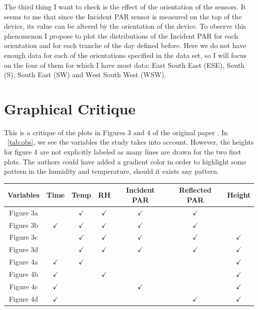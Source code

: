 \documentclass[11pt]{article}\usepackage[]{graphicx}\usepackage[]{color}
\begin{document}
The third thing I want to check is the effect of the orientation of the sensors. It seems to me that since the Incident PAR sensor is measured on the top of the device, its value can be altered by the orientation of the device. To observe this phenomenon I propose to plot the distributions of the Incident PAR for each orientation and for each tranche of the day defined before. Here we do not have enough data for each of the orientations specified in the data set, so I will focus on the four of them for which I have most data: East South East (ESE), South (S), South East (SW) and West South West (WSW).


\section{Graphical Critique}
This is a critique of the plots in Figures 3 and 4 of the original paper \cite{tolle2005macroscope}. In  ~\ref{tab:obs}, we see the variables the study takes into account. However, the heights for figure 4 are not explicitly labeled as many lines are drawn for the two first plots. The authors could have added a gradient color in order to highlight some pattern in the humidity and temperature, should it exists any pattern. 
\begin{center}
   \begin{tabular}{| c | c | c | c | c | c | c |}
     \hline
     Variables & Time         & Temp         & RH          & Incident PAR & Reflected PAR& Height\\ \hline
     Figure 3a &              & $\checkmark$ &$\checkmark$ & $\checkmark$ & $\checkmark$ &             \\ \hline
     Figure 3b & $\checkmark$ & $\checkmark$ &$\checkmark$ & $\checkmark$ & $\checkmark$ &             \\ \hline
     Figure 3c &              & $\checkmark$ &$\checkmark$ & $\checkmark$ & $\checkmark$ & $\checkmark$\\ \hline
     Figure 3d &              & $\checkmark$ &$\checkmark$ & $\checkmark$ & $\checkmark$ & $\checkmark$\\ \hline
     Figure 4a & $\checkmark$ & $\checkmark$ &             &              &              & $\checkmark$\\ \hline
     Figure 4b & $\checkmark$ &              &$\checkmark$ &              &              & $\checkmark$\\ \hline
     Figure 4c & $\checkmark$ &              &             & $\checkmark$ &              & $\checkmark$\\ \hline
     Figure 4d & $\checkmark$ &              &             &              & $\checkmark$ & $\checkmark$\\
     \hline
   \end{tabular}
    \label{tab:obs} 
\end{center}
\end{document}
